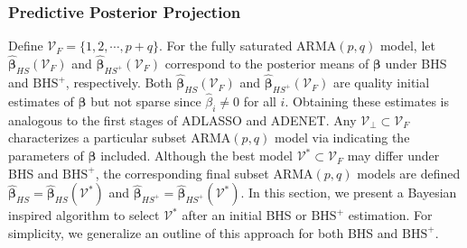 \subsubsection{Predictive Posterior Projection}

Define $\mathcal{V}_F=\{1,2,\cdots,p+q\}$. For the fully saturated ARMA$(p,q)$ model, let $\hat{\bm{\beta}}_{HS}(\mathcal{V}_F)$ and $\hat{\bm{\beta}}_{HS^{+}}(\mathcal{V}_F)$ correspond to the posterior means of $\bm{\beta}$ under BHS and $\textrm{BHS}^+$, respectively. Both $\hat{\bm{\beta}}_{HS}(\mathcal{V}_F)$ and $\hat{\bm{\beta}}_{HS^{+}}(\mathcal{V}_F)$ are quality initial estimates of $\bm{\beta}$ but not sparse since $\hat{\beta}_i \neq 0$ for all $i$. Obtaining these estimates is analogous to the first stages of ADLASSO and ADENET. Any $\mathcal{V}_\perp \subset \mathcal{V}_F$ characterizes a particular subset ARMA$(p,q)$ model via indicating the parameters of $\bm{\beta}$ included.  Although the best model $\mathcal{V}^* \subset \mathcal{V}_F$ may differ under BHS and $\textrm{BHS}^+$, the corresponding final subset ARMA$(p,q)$ models are defined $\hat{\bm{\beta}}_{HS}=\hat{\bm{\beta}}_{HS}(\mathcal{V}^*)$ and $\hat{\bm{\beta}}_{HS^{+}}=\hat{\bm{\beta}}_{HS^{+}}(\mathcal{V}^*)$. In this section, we present a Bayesian inspired algorithm to select $\mathcal{V}^*$ after an initial BHS or $\textrm{BHS}^+$ estimation. For simplicity, we generalize an outline of this approach for both BHS and $\textrm{BHS}^+$.

